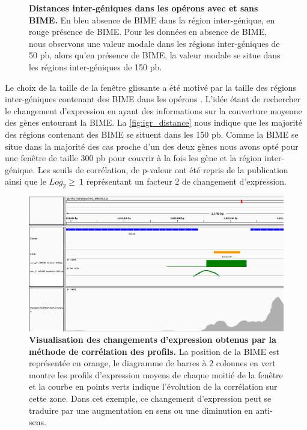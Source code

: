 \documentclass[12pt,a4paper]{report}
\begin{document}
\begin{onehalfspace}
\begin{figure}
{\caption{\textbf{Distances inter-géniques dans les opérons avec et sans BIME.} En bleu absence de BIME dans la région inter-génique, en rouge présence de BIME. Pour les données en absence de BIME, nous observons une valeur modale dans les régions inter-géniques de 50 pb, alors qu'en présence de BIME, la valeur modale se situe dans les régions inter-géniques de 150 pb.}
\label{fig:igr_distance} }
\end{figure}

Le choix de la taille de la fenêtre glissante a été motivé par la taille des régions inter-géniques contenant des BIME dans les opérons . L'idée étant de rechercher le changement d'expression en ayant des informations sur la couverture moyenne des gènes entourant la BIME. La \autoref{fig:igr_distance} nous indique que les majorité des régions contenant des BIME se situent dans les 150 pb. Comme la BIME se situe dans la majorité des cas proche d'un des deux gènes nous avons opté pour une fenêtre de taille 300 pb pour couvrir à la fois les gène et la région inter-génique. Les seuils de corrélation, de p-valeur ont été repris de la publication ainsi que le $Log_2 \geq~1$ représentant un facteur 2 de changement d'expression.

\begin{figure}[ht]
\centerline{\includegraphics[scale=0.35]{figures/igv_profil.png}}
\caption{\textbf{Visualisation des changements d'expression obtenus par la méthode de corrélation des profils.} La position de la BIME est représentée en orange, le diagramme de barres à 2 colonnes en vert montre les profils d'expression moyens de chaque moitié de la fenêtre et la courbe en points verts indique l'évolution de la corrélation sur cette zone. Dans cet exemple, ce changement d'expression peut se traduire par une augmentation en sens ou une diminution en anti-sens.}
\label{fig:igv_profil} 
\end{figure}


\end{onehalfspace}
\end{document}
